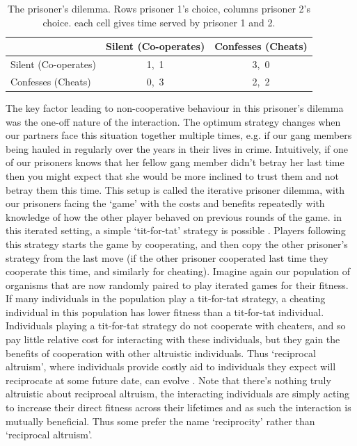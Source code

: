 \begin{table}
\begin{tabular}{l|*{2}{c}}\hline
  & Silent (Co-operates) & Confesses (Cheats)\\ \hline
Silent (Co-operates)  & 1,~1 & 3,~0 \\  %
Confesses (Cheats) & 0,~3 & 2,~2\\      %
\end{tabular}
\caption{The prisoner's  dilemma. Rows prisoner 1's choice, columns prisoner 2's choice. each cell gives time served by prisoner 1 and 2.}
\end{table}

The key factor leading to non-cooperative behaviour in this prisoner's
dilemma was the one-off nature of the interaction. The optimum
strategy changes when our partners face this situation together
multiple times, e.g. if our gang members being hauled in regularly
over the years in their lives in crime. Intuitively, if one of our
prisoners knows that her fellow gang member didn't betray her last
time then you might expect that she would be more inclined to trust
them and not betray them this time. This setup is called the iterative
prisoner dilemma, with our prisoners facing the `game' with the costs
and benefits repeatedly with knowledge of how the other player behaved
on previous rounds of the game.  in this iterated setting, a simple
`tit-for-tat'  strategy is possible \citep{axelrod1981evolution}. Players following this strategy
starts the game by cooperating, and then copy the other prisoner's
strategy from the last move (if the other prisoner cooperated last time
they cooperate this time, and similarly for cheating). Imagine again
our population of organisms that are now randomly paired to play
iterated games for their fitness. If many individuals in the
population play a tit-for-tat strategy, a cheating individual in this
population has lower fitness than a tit-for-tat
individual. Individuals playing a tit-for-tat strategy do not
cooperate with cheaters, and so pay little relative cost for
interacting with these individuals, but they gain the benefits of
cooperation with other altruistic individuals. Thus `reciprocal
altruism', where individuals provide costly aid to individuals they
expect will reciprocate at some future date, can evolve \citep{trivers1971evolution}. Note that there's nothing truly altruistic about reciprocal
altruism, the interacting individuals are simply acting to increase their direct
fitness across their lifetimes and as such the interaction is mutually beneficial. Thus some
prefer the name `reciprocity' rather than `reciprocal altruism'.

